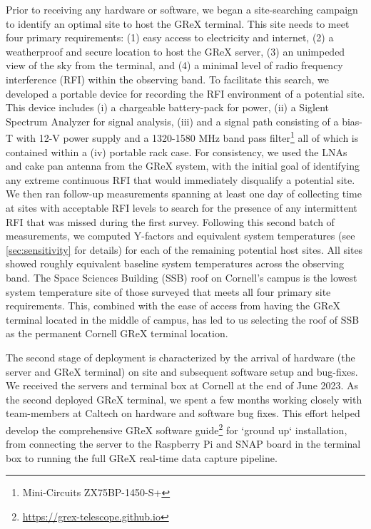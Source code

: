 Prior to receiving any hardware or software, we began a site-searching campaign to identify an optimal site to host the GReX terminal.
This site needs to meet four primary requirements: (1) easy access to electricity and internet, (2) a weatherproof and secure location to host the GReX server, (3) an unimpeded view of the sky from the terminal, and (4) a minimal level of radio frequency interference (RFI) within the observing band.
To facilitate this search, we developed a portable device for recording the RFI environment of a potential site. 
This device includes (i) a chargeable battery-pack for power, (ii) a Siglent Spectrum Analyzer for signal analysis, (iii) and a signal path consisting of a bias-T with 12-V power supply and a 1320-1580 MHz band pass filter\footnote{Mini-Circuits ZX75BP-1450-S+} all of which is contained within a (iv) portable rack case.
For consistency, we used the LNAs and cake pan antenna from the GReX system, with the initial goal of identifying any extreme continuous RFI that would immediately disqualify a potential site.
We then ran follow-up measurements spanning at least one day of collecting time at sites with acceptable RFI levels to search for the presence of any intermittent RFI that was missed during the first survey.
Following this second batch of measurements, we computed Y-factors and equivalent system temperatures (see \autoref{sec:sensitivity} for details) for each of the remaining potential host sites.
All sites showed roughly equivalent baseline system temperatures across the observing band. 
The Space Sciences Building (SSB) roof on Cornell's campus is the lowest system temperature site of those surveyed that meets all four primary site requirements. 
This, combined with the ease of access from having the GReX terminal located in the middle of campus, has led to us selecting the roof of SSB as the permanent Cornell GReX terminal location.

The second stage of deployment is characterized by the arrival of hardware (the server and GReX terminal) on site and subsequent software setup and bug-fixes. 
We received the servers and terminal box at Cornell at the end of June 2023. 
As the second deployed GReX terminal, we spent a few months working closely with team-members at Caltech on hardware and software bug fixes. 
This effort helped develop the comprehensive GReX software guide\footnote{\url{https://grex-telescope.github.io}} for `ground up` installation, from connecting the server to the Raspberry Pi and SNAP board in the terminal box to running the full GReX real-time data capture pipeline. 

